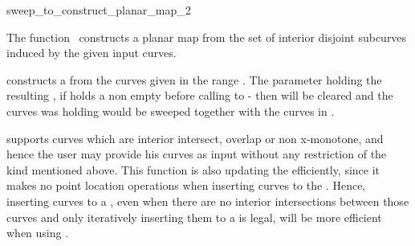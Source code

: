 

\begin{ccRefFunction}[CGAL::]{sweep_to_construct_planar_map_2}  %


\ccDefinition
  
The function \ccRefName\ constructs a planar map from the set of 
interior disjoint subcurves induced by the given input curves.



\def\ccLongParamLayout{\ccTrue} 


constructs a  from the curves given in the range
\ccStyle{[curves_begin, curves_end)}. The parameter 
holding the resulting , if  holds a
non empty  before calling to
 - then  will be
cleared and the curves  was holding would be sweeped
together with the curves in \ccStyle{[curves_begin, curves_end)}.

 supports curves which are
interior intersect, overlap or non x-monotone, and hence the user may
provide his curves as input without any restriction of the kind
mentioned above. This function is also updating the 
efficiently, since it makes no point location operations when
inserting curves to the . Hence, inserting curves to a
, even when there are no interior intersections
between those curves and only iteratively inserting them to a
 is legal, will be more efficient when using
.


\end{ccRefFunction}
